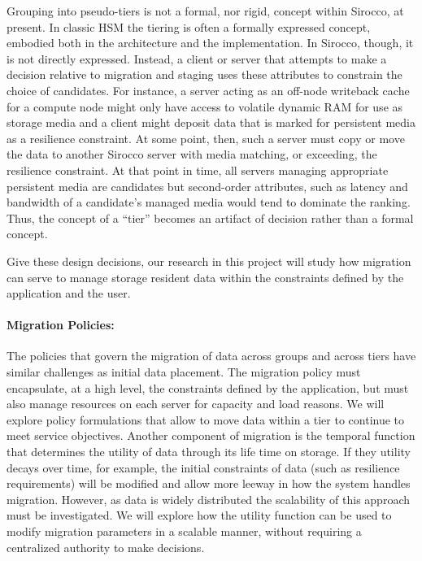 Grouping into pseudo-tiers is not a formal, nor rigid, concept within
Sirocco, at present. In classic HSM the tiering is often a formally
expressed concept, embodied both in the architecture and the implementation.
In Sirocco, though, it is not directly expressed. Instead, a client or
server that attempts to make a decision relative to migration and staging
uses these attributes to constrain the choice of candidates. For instance, a
server acting as an off-node writeback cache for a compute node might only
have access to volatile dynamic RAM for use as storage media and a client
might deposit data that is marked for persistent media as a resilience
constraint. At some point, then, such a server must copy or move the data to
another Sirocco server with media matching, or exceeding, the resilience
constraint. At that point in time, all servers managing appropriate
persistent media are candidates but second-order attributes, such as latency
and bandwidth of a candidate's managed media would tend to dominate the
ranking. Thus, the concept of a ``tier'' becomes an artifact of decision
rather than a formal concept.

Give these design decisions, our research in this project will study how
migration can serve to manage storage resident data within the constraints
defined by the application and the user. 

\paragraph{Migration Policies:}
The policies that govern the migration of data across groups and across
tiers have similar challenges as initial data placement. The migration
policy must encapsulate, at a high level, the constraints defined by the
application, but must also manage resources on each server for capacity and
load reasons. We will explore policy formulations that allow \Sir to move
data within a tier to continue to meet service objectives. Another component
of migration is the temporal function that determines the utility of data
through its life time on storage. If they utility decays over time, for
example, the initial constraints of data (such as resilience requirements)
will be modified and allow more leeway in how the system handles migration.
However, as data is widely distributed the scalability of this approach must
be investigated. 
We will explore how the utility function can be used to modify migration
parameters in a scalable manner, without requiring a centralized authority
to make decisions. 

